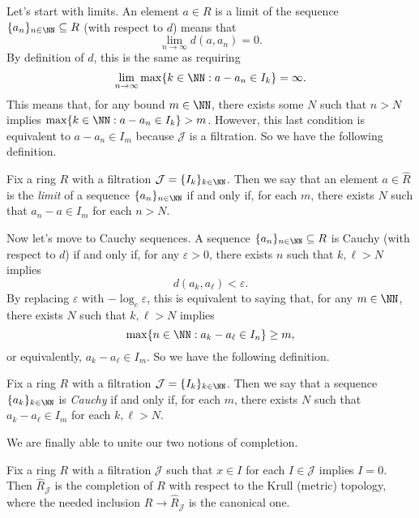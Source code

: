 Let's start with limits. An element $a\in R$ is a limit of the sequence $\{a_n\}_{n\in\NN}\subseteq R$ (with respect to  $d$) means that
\[\lim_{n\to\infty}d(a,a_n)=0.\]
By definition of $d$, this is the same as requiring
\[\lim_{n\to\infty}\max\{k\in\NN:a-a_n\in I_k\}=\infty.\]
This means that, for any bound $m\in\NN$, there exists some $N$ such that $n>N$ implies $\max\{k\in\NN:a-a_n\in I_k\}>m$. However, this last condition is equivalent to $a-a_n\in I_m$ because $\mathcal J$ is a filtration. So we have the following definition.
\begin{definition}[Limit]
	Fix a ring $R$ with a filtration $\mathcal J=\{I_k\}_{k\in\NN}$. Then we say that an element $a\in\widehat R$ is the \textit{limit} of a sequence $\{a_n\}_{n\in\NN}$ if and only if, for each $m$, there exists $N$ such that $a_n-a\in I_m$ for each $n>N$.
\end{definition}
Now let's move to Cauchy sequences. A sequence $\{a_n\}_{n\in\NN}\subseteq R$ is Cauchy (with respect to $d$) if and only if, for any $\varepsilon>0$, there exists $n$ such that $k,\ell>N$ implies
\[d(a_k,a_\ell)<\varepsilon.\]
By replacing $\varepsilon$ with $-\log_c\varepsilon$, this is equivalent to saying that, for any $m\in\NN$, there exists $N$ such that $k,\ell>N$ implies
\[\max\{n\in\NN:a_k-a_\ell\in I_n\}\ge m,\]
or equivalently, $a_k-a_\ell\in I_m$. So we have the following definition.
\begin{definition}
	Fix a ring $R$ with a filtration $\mathcal J=\{I_k\}_{k\in\NN}$. Then we say that a sequence $\{a_k\}_{k\in\NN}$ is \textit{Cauchy} if and only if, for each $m$, there exists $N$ such that $a_k-a_\ell\in I_m$ for each $k,\ell>N$.
\end{definition}
We are finally able to unite our two notions of completion.
\begin{prop} \label{prop:unitecompletion}
	Fix a ring $R$ with a filtration $\mathcal J$ such that $x\in I$ for each $I\in\mathcal J$ implies $I=0$. Then $\widehat R_\mathcal J$ is the completion of $R$ with respect to the Krull (metric) topology, where the needed inclusion $R\to\widehat R_\mathcal J$ is the canonical one.
\end{prop}
